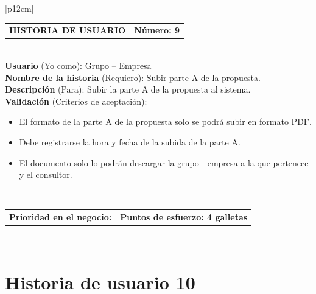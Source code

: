 \documentclass[11pt,letterpaper]{report}
\begin{document}
	\begin{center}	
		\begin{tabular}{|p{12cm}|}
			\hline
			\begin{tabular}{c|c}
				\textbf{HISTORIA DE USUARIO} & \textbf{Número: 9} \\
			\end{tabular} \\ \hline
			\textbf{Usuario} (Yo como): Grupo – Empresa \\ \hline
			\textbf{Nombre de la historia} (Requiero): Subir parte A de la propuesta. \\ \hline
			\textbf{Descripción} (Para): Subir la parte A de la propuesta al sistema. \\ \hline
			\textbf{Validación} (Criterios de aceptación): \\
			\begin{minipage}{12cm}
				\begin{itemize}
					\item El formato de la parte A de la propuesta solo se podrá subir en formato PDF.
					\item Debe registrarse la hora y fecha de la subida de la parte A.
					\item El documento solo lo podrán descargar la grupo - empresa a la que pertenece y el consultor.
				\end{itemize}
			\end{minipage} \\ \hline
			\begin{tabular}{p{6cm}|c}
				\textbf{Prioridad en el negocio: } & \textbf{Puntos de esfuerzo: 4 galletas} \\
			\end{tabular} \\ \hline
		\end{tabular}
	\end{center}
	
	\section{Historia de usuario 10}
	
\end{document}
